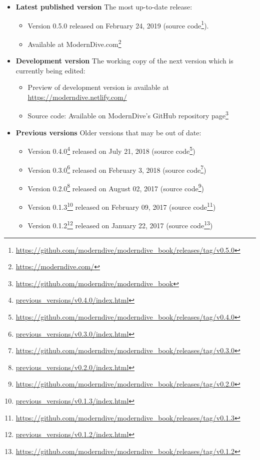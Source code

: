 \documentclass[12pt, krantz2,]{krantz}
\providecommand{\tightlist}{%
  \setlength{\itemsep}{0pt}\setlength{\parskip}{0pt}}
\renewcommand{\href}[2]{#2\footnote{\url{#1}}}
\begin{document}
\begin{itemize}
\tightlist
\item
  \textbf{Latest published version} The most up-to-date release:

  \begin{itemize}
  \tightlist
  \item
    Version 0.5.0 released on February 24, 2019 (\href{https://github.com/moderndive/moderndive_book/releases/tag/v0.5.0}{source code}).
  \item
    Available at \href{https://moderndive.com/}{ModernDive.com}
  \end{itemize}
\item
  \textbf{Development version} The working copy of the next version which is currently being edited:

  \begin{itemize}
  \tightlist
  \item
    Preview of development version is available at \url{https://moderndive.netlify.com/}
  \item
    Source code: Available on ModernDive's \href{https://github.com/moderndive/moderndive_book}{GitHub repository page}
  \end{itemize}
\item
  \textbf{Previous versions} Older versions that may be out of date:

  \begin{itemize}
  \tightlist
  \item
    \href{previous_versions/v0.4.0/index.html}{Version 0.4.0} released on July 21, 2018 (\href{https://github.com/moderndive/moderndive_book/releases/tag/v0.4.0}{source code})
  \item
    \href{previous_versions/v0.3.0/index.html}{Version 0.3.0} released on February 3, 2018 (\href{https://github.com/moderndive/moderndive_book/releases/tag/v0.3.0}{source code})
  \item
    \href{previous_versions/v0.2.0/index.html}{Version 0.2.0} released on August 02, 2017 (\href{https://github.com/moderndive/moderndive_book/releases/tag/v0.2.0}{source code})
  \item
    \href{previous_versions/v0.1.3/index.html}{Version 0.1.3} released on February 09, 2017 (\href{https://github.com/moderndive/moderndive_book/releases/tag/v0.1.3}{source code})
  \item
    \href{previous_versions/v0.1.2/index.html}{Version 0.1.2} released on January 22, 2017 (\href{https://github.com/moderndive/moderndive_book/releases/tag/v0.1.2}{source code})
  \end{itemize}
\end{itemize}
\end{document}
